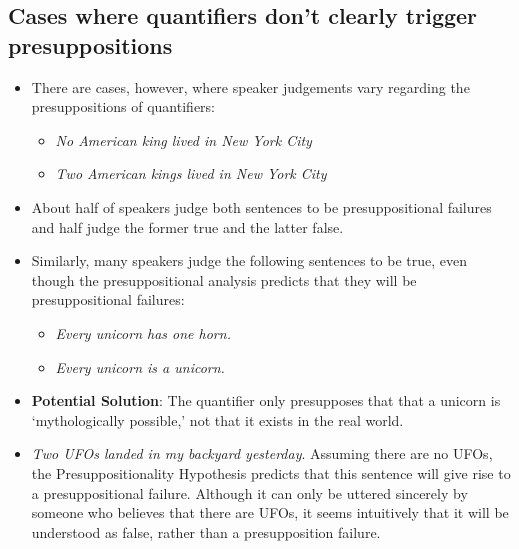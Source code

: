 \documentclass[a4paper]{article}
\begin{document}
\subsection{Cases where quantifiers don't clearly trigger presuppositions}

\begin{itemize}
  \item There are cases, however, where speaker judgements vary regarding the presuppositions of quantifiers:
  \begin{itemize}
    \item \emph{No American king lived in New York City}
    \item \emph{Two American kings lived in New York City}
  \end{itemize}
  \item About half of speakers judge both sentences to be presuppositional failures and half judge the former true and the latter false.
  \item Similarly, many speakers judge the following sentences to be true, even though the presuppositional analysis predicts that they will be presuppositional failures:
  \begin{itemize}
    \item \emph{Every unicorn has one horn.}
    \item \emph{Every unicorn is a unicorn.}
  \end{itemize}
  \item \textbf{Potential Solution}: The quantifier only presupposes that that a unicorn is `mythologically possible,' not that it exists in the real world.
  \item \emph{Two UFOs landed in my backyard yesterday}. Assuming there are no UFOs, the Presuppositionality Hypothesis predicts that this sentence will give rise to a presuppositional failure. Although it can only be uttered sincerely by someone who believes that there are UFOs, it seems intuitively that it will be understood as false, rather than a presupposition failure.
\end{itemize}
\end{document}

